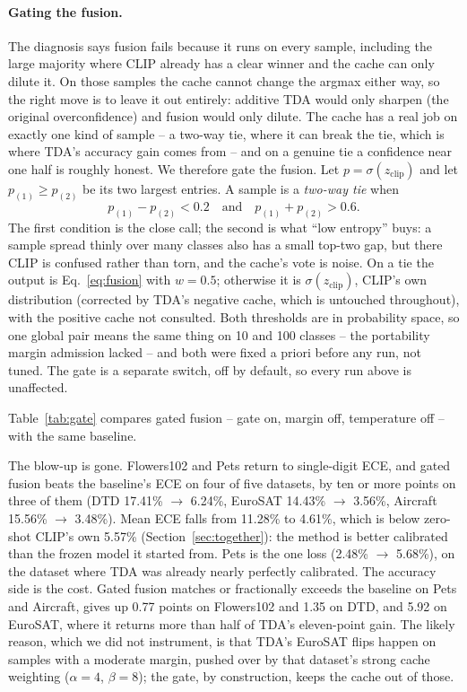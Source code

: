 \paragraph{Gating the fusion.}
The diagnosis says fusion fails because it runs on every sample, including the large majority
where CLIP already has a clear winner and the cache can only dilute it. On those samples the
cache cannot change the argmax either way, so the right move is to leave it out entirely:
additive TDA would only sharpen (the original overconfidence) and fusion would only dilute. The
cache has a real job on exactly one kind of sample -- a two-way tie, where it can break the tie,
which is where TDA's accuracy gain comes from -- and on a genuine tie a confidence near one half
is roughly honest. We therefore gate the fusion. Let $p = \sigma(z_{\text{clip}})$ and let
$p_{(1)} \geq p_{(2)}$ be its two largest entries. A sample is a \emph{two-way tie} when
\begin{equation}
    p_{(1)} - p_{(2)} < 0.2 \quad\text{and}\quad p_{(1)} + p_{(2)} > 0.6 .
    \label{eq:gate}
\end{equation}
The first condition is the close call; the second is what ``low entropy'' buys: a sample spread
thinly over many classes also has a small top-two gap, but there CLIP is confused rather than
torn, and the cache's vote is noise. On a tie the output is Eq.~\eqref{eq:fusion} with
$w = 0.5$; otherwise it is $\sigma(z_{\text{clip}})$, CLIP's own distribution (corrected by
TDA's negative cache, which is untouched throughout), with the positive cache not consulted.
Both thresholds are in probability space, so one global pair means the same thing on 10 and
100 classes -- the portability margin admission lacked -- and both were fixed a priori before
any run, not tuned. The gate is a separate switch, off by default, so every run above is
unaffected.

Table~\ref{tab:gate} compares gated fusion -- gate on, margin off, temperature off -- with
the same baseline.



The blow-up is gone. Flowers102 and Pets return to single-digit ECE, and gated fusion beats the
baseline's ECE on four of five datasets, by ten or more points on three of them (DTD 17.41\%
$\rightarrow$ 6.24\%, EuroSAT 14.43\% $\rightarrow$ 3.56\%, Aircraft 15.56\% $\rightarrow$
3.48\%). Mean ECE falls from 11.28\% to 4.61\%, which is below zero-shot CLIP's own 5.57\%
(Section~\ref{sec:together}): the method is better calibrated than the frozen model it started
from. Pets is the one loss (2.48\% $\rightarrow$ 5.68\%), on the dataset where TDA was already
nearly perfectly calibrated. The accuracy side is the cost. Gated fusion matches or fractionally
exceeds the baseline on Pets and Aircraft, gives up 0.77 points on Flowers102 and 1.35 on DTD,
and 5.92 on EuroSAT, where it returns more than half of TDA's eleven-point gain. The likely
reason, which we did not instrument, is that TDA's EuroSAT flips happen on samples with a
moderate margin, pushed over by that dataset's strong cache weighting ($\alpha = 4$,
$\beta = 8$); the gate, by construction, keeps the cache out of those.

